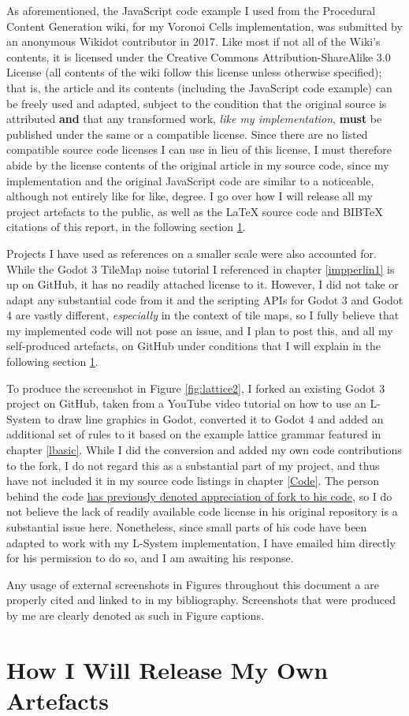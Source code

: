 As aforementioned, the JavaScript code example I used from the Procedural Content Generation wiki\cite{pcgwikivoronoi}, for my Voronoi Cells implementation, was submitted by an anonymous Wikidot contributor in 2017. Like most if not all of the Wiki's contents, it is licensed under the Creative Commons Attribution-ShareAlike 3.0 License (all contents of the wiki follow this license unless otherwise specified); that is, the article and its contents (including the JavaScript code example) can be freely used and adapted, subject to the condition that the original source is attributed \textbf{and} that any transformed work, \textit{like my implementation}, \textbf{must} be published under the same or a compatible license.\cite{cc_at_sa_3} Since there are no listed compatible source code licenses I can use in lieu of this license\cite{cc_compat}, I must therefore abide by the license contents of the original article in my source code, since my implementation and the original JavaScript code are similar to a noticeable, although not entirely like for like, degree. I go over how I will release all my project artefacts to the public, as well as the \LaTeX{} source code and BIB\TeX{} citations of this report, in the following section \ref{howrelease}.

Projects I have used as references on a smaller scale were also accounted for. While the Godot 3 TileMap noise tutorial I referenced in chapter \ref{impperlin1} is up on GitHub, it has no readily attached license to it.\cite{gingergd3tutorialGH} However, I did not take or adapt any substantial code from it and the scripting APIs for Godot 3 and Godot 4 are vastly different, \textit{especially} in the context of tile maps, so I fully believe that my implemented code will not pose an issue, and I plan to post this, and all my self-produced artefacts, on GitHub under conditions that I will explain in the following section \ref{howrelease}.

To produce the screenshot in Figure \ref{fig:lattice2}, I forked an existing Godot 3 project on GitHub\cite{codatGD3LSystemGH}, taken from a YouTube video tutorial on how to use an L-System to draw line graphics in Godot\cite{codatGD3LSystemYT}, converted it to Godot 4 and added an additional set of rules to it based on the example lattice grammar featured in chapter \ref{lbasic}.\cite{codatGD4LSystemGH} While I did the conversion and added my own code contributions to the fork, I do not regard this as a substantial part of my project, and thus have not included it in my source code listings in chapter \ref{Code}. The person behind the code \hyperlink{https://www.youtube.com/watch?v=eY9XkJERiG0&lc=UgwXjzr7jheuC9hH18h4AaABAg}{has previously denoted appreciation of fork to his code}, so I do not believe the lack of readily available code license in his original repository is a substantial issue here. Nonetheless, since small parts of his code have been adapted to work with my L-System implementation, I have emailed him directly for his permission to do so, and I am awaiting his response.

Any usage of external screenshots in Figures throughout this document a are properly cited and linked to in my bibliography. Screenshots that were produced by me are clearly denoted as such in Figure captions. 

\section{How I Will Release My Own Artefacts} \label{howrelease}
